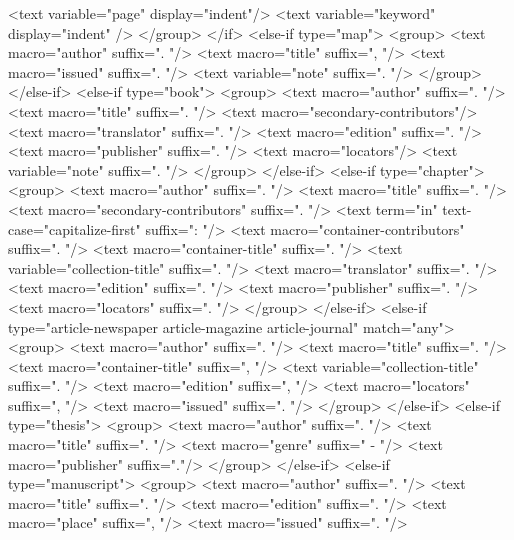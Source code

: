             <text variable="page"  display="indent"/>
            <text variable="keyword"  display="indent" />
          </group>
        </if>
        <else-if type="map">
          <group>
            <text macro="author" suffix=". "/>
            <text macro="title" suffix=", "/>
            <text macro="issued" suffix=". "/>
            <text variable="note" suffix=". "/>
          </group>
        </else-if>
        <else-if type="book">
          <group>
            <text macro="author" suffix=". "/>
            <text macro="title" suffix=". "/>
            <text macro="secondary-contributors"/>
            <text macro="translator" suffix=". "/>
            <text macro="edition" suffix=". "/>
            <text macro="publisher" suffix=". "/>
            <text macro="locators"/>
            <text variable="note" suffix=". "/>
          </group>
        </else-if>
        <else-if type="chapter">
          <group>
            <text macro="author" suffix=". "/>
            <text macro="title" suffix=". "/>
            <text macro="secondary-contributors" suffix=". "/>
            <text term="in" text-case="capitalize-first" suffix=": "/>
            <text macro="container-contributors" suffix=". "/>
            <text macro="container-title" suffix=". "/>
            <text variable="collection-title" suffix=". "/>
            <text macro="translator" suffix=". "/>
            <text macro="edition" suffix=". "/>
            <text macro="publisher" suffix=". "/>
            <text macro="locators" suffix=". "/>
          </group>
        </else-if>
        <else-if type="article-newspaper article-magazine article-journal" match="any">
          <group>
            <text macro="author" suffix=". "/>
            <text macro="title" suffix=". "/>
            <text macro="container-title" suffix=", "/>
            <text variable="collection-title" suffix=". "/>
            <text macro="edition" suffix=", "/>
            <text macro="locators" suffix=", "/>
            <text macro="issued" suffix=". "/>
          </group>
        </else-if>
        <else-if type="thesis">
          <group>
            <text macro="author" suffix=". "/>
            <text macro="title" suffix=". "/>
            <text macro="genre" suffix=" - "/>
            <text macro="publisher" suffix="."/>
          </group>
        </else-if>
        <else-if type="manuscript">
          <group>
            <text macro="author" suffix=". "/>
            <text macro="title" suffix=". "/>
            <text macro="edition" suffix=". "/>
            <text macro="place" suffix=", "/>
            <text macro="issued" suffix=". "/>
